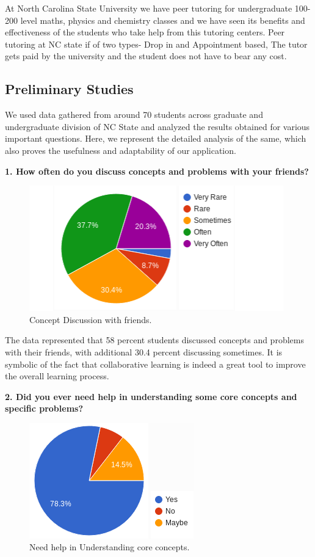 \documentclass{sig-alternate-05-2015}
\begin{document}
At North Carolina State University we have peer tutoring for undergraduate 100-200 level maths, physics and chemistry classes and we have seen its benefits and effectiveness of the students who take help from this tutoring centers. Peer tutoring at NC state if of two types- Drop in and Appointment based, The tutor gets paid by the university and the student does not have to bear any cost. 

\subsection{Preliminary Studies}
We used data gathered from around 70 students across graduate and undergraduate division of NC State and analyzed the results obtained for various important questions. Here, we represent the detailed analysis of the same, which also proves the usefulness and adaptability of our application.

\textbf {1. How often do you discuss concepts and problems with your friends?}

\begin{figure}[ht]
\centering
\includegraphics{Q1SE}
\caption{Concept Discussion with friends.}
\end{figure}

The data represented that 58 percent students discussed concepts and problems with their friends, with additional 30.4 percent discussing sometimes. It is symbolic of the fact that collaborative learning is indeed a great tool to improve the overall learning process. 

\textbf {2. Did you ever need help in understanding some core concepts and specific problems?}

\begin{figure}[ht]
\centering
\includegraphics{Q2SE}
\caption{Need help in Understanding core concepts.}
\end{figure}
\end{document}
